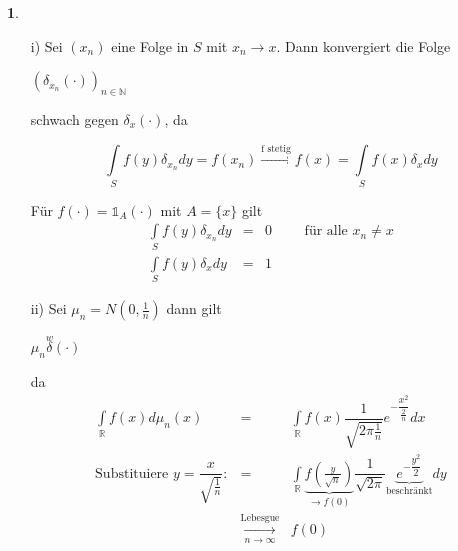 \documentclass[10pt,a4paper]{report}
\newcommand{\N}{\mathbb{N}}
\newcommand{\R}{\mathbb{R}}
\numberwithin{equation}{section}
\numberwithin{figure}{section}
\theoremstyle{plain}
\theoremstyle{definition}
\newtheorem{example}[thm]{\protect\examplename}
\theoremstyle{remark}
\theoremstyle{plain}
\providecommand{\examplename}{Beispiel}
\newcommand{\1}{ \mathbb{1} } %
\begin{document}
\begin{example}
  \begin{itemize}
  \item[i)] Sei $(x_n)$ eine Folge in $S$ mit $x_n \to x$. Dann
    konvergiert die Folge
    \begin{center}
      $(\delta_{x_n}(\cdot))_{n \in \N}$
    \end{center}
    schwach gegen $\delta_x(\cdot)$, da
    \begin{center}
      \[\int\limits_Sf(y)\delta_{x_n} dy=f(x_n) \overset{\text{f
          stetig}}{\to} f(x)=\int\limits_S f(x)\delta_x dy \]
    \end{center}
    Für $f(\cdot)=\1_A(\cdot)$ mit $A=\{x\}$ gilt
    \begin{eqnarray*}
      \int\limits_S f(y)\delta_{x_n} dy &=& 0 \qquad \text{ für alle } x_n \neq x\\
      \int\limits_S f(y) \delta_x  dy &=& 1
    \end{eqnarray*}
  \item[ii)] Sei $\mu_n=N(0,\frac{1}{n})$ dann gilt
    \begin{center}
      $\mu_n \overset{w} \delta(\cdot)$
    \end{center}
    da
    \begin{eqnarray*}
      \int\limits_\R f(x) d\mu_n(x) &=& \int\limits_\R f(x)\dfrac{1}{\sqrt{2\pi \frac{1}{n}}}e^{-\dfrac{x^2}{\frac{2}{n}}} dx\\
      \text{Substituiere } y=\dfrac{x}{\sqrt{\frac{1}{n}}}: &=& \int\limits_\R \underbrace{f\left(\frac{y}{\sqrt{n}}\right)}_{\to f(0)} \dfrac{1}{\sqrt{2\pi}}\underbrace{e^{-\dfrac{y^2}{2}}}_{\text{beschränkt}} dy\\
      &\underset{n \to \infty}{\overset{\text{Lebesgue}}{\to}} &f(0)
    \end{eqnarray*}
  \end{itemize}
\end{example}
\end{document}
